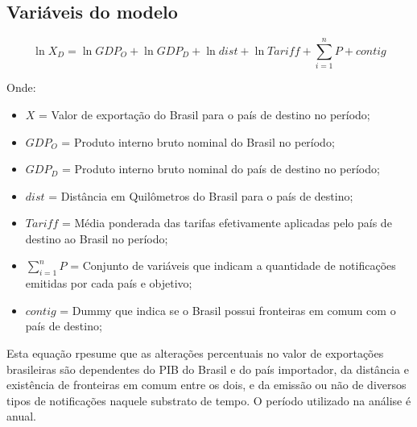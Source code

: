 \documentclass[12pt, a4paper]{article}
\begin{document}
\subsection{Variáveis do modelo}

\begin{equation}
    \ln X_{D} = 
    \ln GDP_{O} 
    + \ln GDP_{D} 
    + \ln dist 
    + \ln Tariff 
    + \sum_{i=1}^{n} P 
    + contig 
\end{equation}

Onde:

\begin{itemize}
    \item $X$ = Valor de exportação do Brasil para o país de destino no período;
    \item $GDP_{O}$ = Produto interno bruto nominal do Brasil no período;
    \item $GDP_{D}$ = Produto interno bruto nominal do país de destino no período;
    \item $dist$ = Distância em Quilômetros  do Brasil para o país de destino;
    \item $Tariff$ = Média ponderada das tarifas efetivamente aplicadas pelo país de destino ao Brasil no período;
    \item $\sum_{i=1}^{n} P$ = Conjunto de variáveis que indicam a quantidade de notificações emitidas por cada país e objetivo;
    \item $contig$ = Dummy que indica se o Brasil possui fronteiras em comum com o país de destino;
\end{itemize}

Esta equação rpesume que as alterações percentuais no valor de exportações brasileiras são dependentes do PIB do Brasil e do país importador, da distância e existência de fronteiras em comum entre os dois, e da emissão ou não de diversos tipos de notificações naquele substrato de tempo. O período utilizado na análise é anual.
\end{document}
